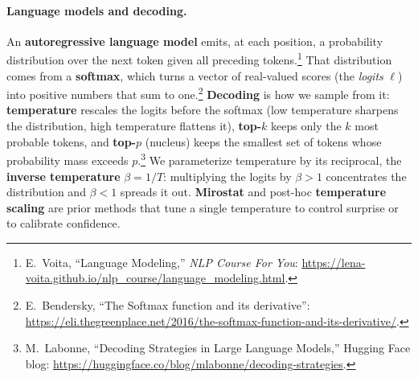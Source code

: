 \documentclass[11pt]{article}
\begin{document}
\paragraph{Language models and decoding.}
An \textbf{autoregressive language model} emits, at each position, a probability
distribution over the next token given all preceding
tokens.\footnote{E.~Voita, ``Language Modeling,'' \emph{NLP Course For You}:
\url{https://lena-voita.github.io/nlp_course/language_modeling.html}.} That
distribution comes from a \textbf{softmax}, which turns a vector of real-valued
scores (the \emph{logits} $\ell$) into positive numbers that sum to
one.\footnote{E.~Bendersky, ``The Softmax function and its derivative'':
\url{https://eli.thegreenplace.net/2016/the-softmax-function-and-its-derivative/}.}
\textbf{Decoding} is how we sample from it: \textbf{temperature} rescales the
logits before the softmax (low temperature sharpens the distribution, high
temperature flattens it), \textbf{top-$k$} keeps only the $k$ most probable
tokens, and \textbf{top-$p$} (nucleus) keeps the smallest set of tokens whose
probability mass exceeds $p$.\footnote{M.~Labonne, ``Decoding Strategies in Large
Language Models,'' Hugging Face blog:
\url{https://huggingface.co/blog/mlabonne/decoding-strategies}.} We parameterize
temperature by its reciprocal, the \textbf{inverse temperature} $\beta=1/T$:
multiplying the logits by $\beta>1$ concentrates the distribution and $\beta<1$
spreads it out. \textbf{Mirostat} \citep{basu2021mirostat} and post-hoc
\textbf{temperature scaling} \citep{guo2017calibration} are prior methods that tune
a single temperature to control surprise or to calibrate confidence.
\end{document}
